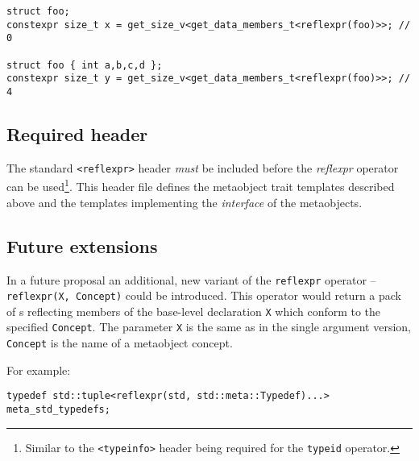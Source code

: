 \begin{verbatim}
struct foo;
constexpr size_t x = get_size_v<get_data_members_t<reflexpr(foo)>>; // 0

struct foo { int a,b,c,d };
constexpr size_t y = get_size_v<get_data_members_t<reflexpr(foo)>>; // 4
\end{verbatim}

\subsection{Required header}
\label{section-reflexpr-header}

The standard \texttt{<reflexpr>} header \emph{must} be included before
the \emph{reflexpr} operator can be used\footnote{Similar to the
\texttt{<typeinfo>} header being required for the \texttt{typeid} operator.}.
This header file defines the metaobject trait templates described above
and the templates implementing the \emph{interface} of the metaobjects.

\subsection{Future extensions}

In a future proposal an additional, new variant of the \texttt{reflexpr} operator
-- \texttt{reflexpr(X, Concept)} could be introduced.
This operator would return a pack of s reflecting members of
the base-level declaration \texttt{X} which conform to the specified
\texttt{Concept}. The parameter \texttt{X} is the same as in the single argument
version, \texttt{Concept} is the name of a metaobject concept.

For example:

\begin{verbatim}
typedef std::tuple<reflexpr(std, std::meta::Typedef)...> meta_std_typedefs;
\end{verbatim}
